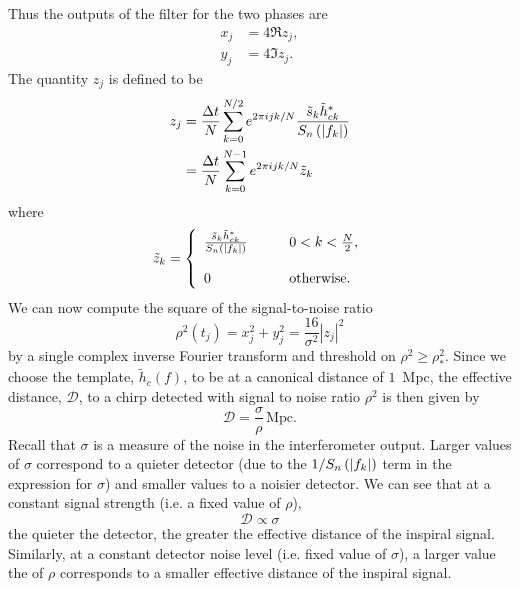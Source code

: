 Thus the outputs of the filter for the two phases are
\begin{align}
x_j &= 4 \Re z_j, \\
y_j &= 4 \Im z_j.
\end{align}
The quantity $z_j$ is defined to be
\begin{equation}
\begin{split}
\label{eq:zdef}
z_j &= \frac{\Delta t}{N}\sum_{k=0}^{N/2} e^{2\pi ijk/N} 
\frac{\tilde{s}_k \tilde{h}_{ck}^\ast}{S_n\left(\left|f_{k}\right|\right)}  \\
&= \frac{\Delta t}{N}\sum_{k=0}^{N-1} e^{2\pi ijk/N} \tilde{z}_k
\end{split}
\end{equation}
where
\begin{equation}
\label{eq:ztildedef}
\tilde{z}_k = \left\{
\begin{array}{ll}
\frac{\tilde{s}_k \tilde{h}_{ck}^\ast}{S_n\left(\left|f_{k}\right|\right)} 
  \quad\quad & 0 < k < \frac{N}{2},\\
\\
0 & \mathrm{otherwise}.
\end{array}
\right.
\end{equation}
We can now compute the square of the signal-to-noise ratio
\begin{equation}
\rho^2(t_j) = x_j^2 + y_j^2 = \frac{16}{\sigma^2}|z_j|^2
\end{equation}
by a single complex inverse Fourier transform and threshold on $\rho^2 \ge
\rho^2_\ast$.  Since we choose the template, $\tilde{h}_c(f)$, to be at a
canonical distance of $1$~Mpc, the effective distance, $\mathcal{D}$, to a chirp
detected with signal to noise ratio $\rho^2$ is then given by
\begin{equation}
\mathcal{D} = \frac{\sigma}{\rho} \,\mathrm{Mpc}.
\label{eq:effdistdef}
\end{equation}
Recall that $\sigma$ is a measure of the noise in the interferometer output.
Larger values of $\sigma$ correspond to a quieter detector (due to the
$1/S_n\left(\left|f_{k}\right|\right)$ term in the expression for $\sigma$) and smaller values to a
noisier detector. We can see that at a constant signal strength (i.e. a fixed
value of $\rho$),
\begin{equation}
\mathcal{D} \propto \sigma
\end{equation}
the quieter the detector, the greater the effective distance of the inspiral
signal. Similarly, at a constant detector noise level (i.e. fixed value of
$\sigma$), a larger value the of $\rho$ corresponds to a smaller effective
distance of the inspiral signal.

